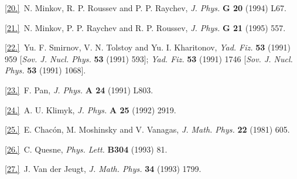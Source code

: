 \ref {20.}\ N. Minkov, R. P. Roussev and P. P. Raychev,
         {\it J. Phys.} {\bf G 20} (1994) L67.

\ref {21.}\ N. Minkov, P. P. Raychev and R. P. Roussev,
         {\it J. Phys.} {\bf G 21} (1995) 557.

\ref {22.}\ Yu. F. Smirnov, V. N. Tolstoy and Yu. I. Kharitonov, {\it Yad. Fiz.}
{\bf 53} (1991) 959 [{\it Sov. J. Nucl. Phys.} {\bf 53} (1991) 593];
{\it Yad. Fiz.} {\bf 53} (1991) 1746 [{\it Sov. J. Nucl. Phys.} {\bf 53}
     (1991) 1068].

\ref {23.}\ F. Pan, {\it J. Phys.} {\bf A 24} (1991) L803.

\ref {24.}\ A. U. Klimyk, {\it J. Phys.} {\bf A 25} (1992) 2919.

\ref {25.}\ E. Chac\'on, M. Moshinsky and V. Vanagas,
     {\it J. Math. Phys.} {\bf 22} (1981) 605.

\ref {26.}\ C. Quesne, {\it Phys. Lett.} {\bf B304} (1993) 81.

\ref {27.}\ J. Van der Jeugt, {\it J. Math. Phys.} {\bf 34} (1993) 1799.


         \vfill\eject\bye

